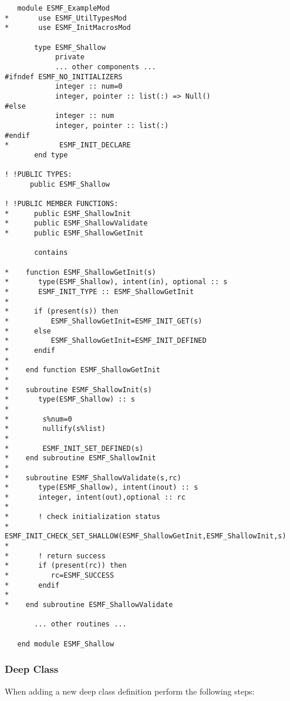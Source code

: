 \begin{verbatim}
   module ESMF_ExampleMod
*       use ESMF_UtilTypesMod 
*       use ESMF_InitMacrosMod 

       type ESMF_Shallow
            private
            ... other components ...
#ifndef ESMF_NO_INITIALIZERS
            integer :: num=0
            integer, pointer :: list(:) => Null()
#else
            integer :: num
            integer, pointer :: list(:)
#endif
*            ESMF_INIT_DECLARE
       end type

! !PUBLIC TYPES:
      public ESMF_Shallow 

! !PUBLIC MEMBER FUNCTIONS:
*      public ESMF_ShallowInit
*      public ESMF_ShallowValidate
*      public ESMF_ShallowGetInit

       contains

*    function ESMF_ShallowGetInit(s)
*       type(ESMF_Shallow), intent(in), optional :: s
*       ESMF_INIT_TYPE :: ESMF_ShallowGetInit
*
*      if (present(s)) then
*          ESMF_ShallowGetInit=ESMF_INIT_GET(s)
*      else
*          ESMF_ShallowGetInit=ESMF_INIT_DEFINED
*      endif
*
*    end function ESMF_ShallowGetInit
*
*    subroutine ESMF_ShallowInit(s)
*       type(ESMF_Shallow) :: s
*    
*        s%num=0 
*        nullify(s%list)
*
*        ESMF_INIT_SET_DEFINED(s) 
*    end subroutine ESMF_ShallowInit
*
*    subroutine ESMF_ShallowValidate(s,rc)
*       type(ESMF_Shallow), intent(inout) :: s
*       integer, intent(out),optional :: rc
*
*       ! check initialization status
*       ESMF_INIT_CHECK_SET_SHALLOW(ESMF_ShallowGetInit,ESMF_ShallowInit,s)
*       
*       ! return success
*       if (present(rc)) then
*          rc=ESMF_SUCCESS
*       endif
*
*    end subroutine ESMF_ShallowValidate

       ... other routines ...

   end module ESMF_Shallow
\end{verbatim}

\subsubsection{Deep Class}

 When adding a new deep class definition perform the following steps:

